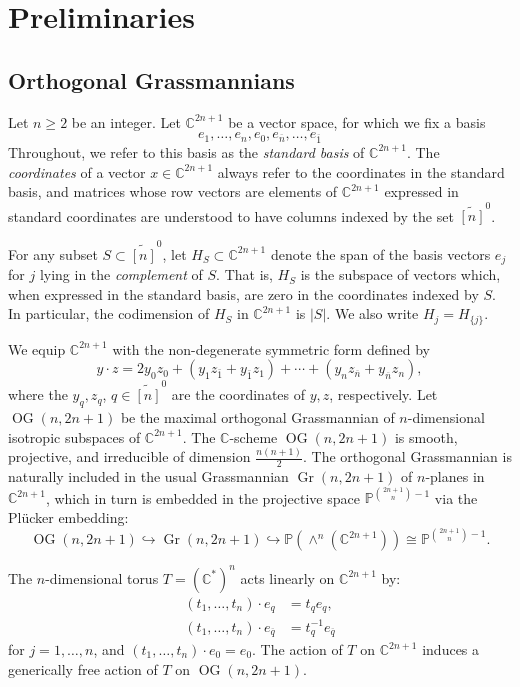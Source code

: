 \documentclass[12pt]{amsart}
\DeclareMathOperator{\Gr}{Gr}
\DeclareMathOperator{\OG}{OG}
\newcommand{\bC}{\mathbb{C}}
\newcommand{\bP}{\mathbb{P}}
\newcommand{\wtn}{\widetilde{[n]}}
\newcommand{\barone}{\overline{1}}
\newcommand{\barn}{\overline{n}}
\newcommand{\barq}{\overline{q}}
\begin{document}
\section{Preliminaries}

\subsection{Orthogonal Grassmannians}\label{sec:OG}

Let $n\ge 2$ be an integer. Let $\bC^{2n+1}$ be a vector space, for which we fix a basis
\begin{equation*}
    e_1,\ldots,e_n,e_0,e_{\barn},\ldots,e_{\barone}
\end{equation*}
Throughout, we refer to this basis as the \emph{standard basis} of $\bC^{2n+1}$. The \emph{coordinates} of a vector $x\in \bC^{2n+1}$ always refer to the coordinates in the standard basis, and matrices whose row vectors are elements of $\bC^{2n+1}$ expressed in standard coordinates are understood to have columns indexed by the set $\wtn^0$.

For any subset $S\subset\wtn^0$, let $H_S\subset \bC^{2n+1}$ denote the span of the basis vectors $e_j$ for $j$ lying in the \emph{complement} of $S$. That is, $H_S$ is the subspace of vectors which, when expressed in the standard basis, are zero in the coordinates indexed by $S$. In particular, the codimension of $H_S$ in $\bC^{2n+1}$ is $|S|$. We also write $H_j=H_{\{j\}}$.

We equip $\bC^{2n+1}$ with the non-degenerate symmetric form defined by
\begin{equation*}
    y\cdot z=2y_0z_0+(y_1z_{\bar1}+y_{\bar1}z_1)+\cdots+(y_nz_{\barn}+y_{\barn}z_n),
\end{equation*}
where the $y_q,z_q$, $q\in\wtn^0$ are the coordinates of $y,z$, respectively. Let $\OG(n,2n+1)$ be the maximal orthogonal Grassmannian of $n$-dimensional isotropic subspaces of $\bC^{2n+1}$. The $\bC$-scheme $\OG(n,2n+1)$ is smooth, projective, and irreducible of dimension $\frac{n(n+1)}{2}$. The orthogonal Grassmannian is naturally included in the usual Grassmannian $\Gr(n,2n+1)$ of $n$-planes in $\bC^{2n+1}$, which in turn is embedded in the projective space $\bP^{\binom{2n+1}{n}-1}$ via the Pl\"{u}cker embedding:
\begin{equation*}
    \OG(n,2n+1)\hookrightarrow \Gr(n,2n+1)\hookrightarrow \bP(\wedge^n(\bC^{2n+1}))\cong \bP^{\binom{2n+1}{n}-1}.
\end{equation*}

The $n$-dimensional torus $T=(\bC^{*})^n$ acts linearly on $\bC^{2n+1}$ by:
\begin{align*}
    (t_1,\ldots,t_n)\cdot e_q&=t_qe_q,\\
    (t_1,\ldots,t_n)\cdot e_{\barq}&=t_q^{-1}e_{\barq}
\end{align*}
for $j=1,\ldots,n$, and $(t_1,\ldots,t_n)\cdot e_0=e_0$. The action of $T$ on $\bC^{2n+1}$ induces a generically free action of $T$ on $\OG(n,2n+1)$.
\end{document}
